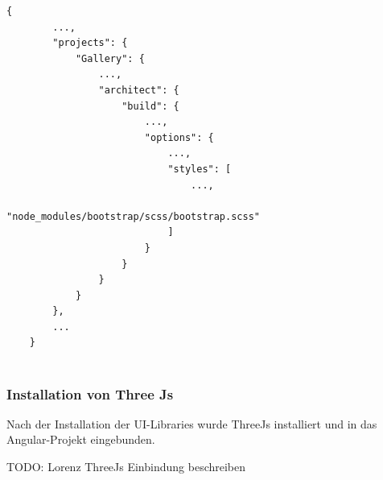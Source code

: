\begin{lstlisting}[caption={{angular.json - Bootstrap Angular Verknüpfung}},label=lst:impl:BootstraptConfig]
    {
        ...,
        "projects": {
            "Gallery": {
                ...,
                "architect": {
                    "build": {
                        ...,
                        "options": {
                            ...,
                            "styles": [
                                ...,
                                "node_modules/bootstrap/scss/bootstrap.scss"
                            ]
                        }
                    }
                }
            }
        },
        ...
    }
    
\end{lstlisting}


\subsubsection{Installation von Three Js}
Nach der Installation der UI-Libraries wurde ThreeJs installiert und in das Angular-Projekt eingebunden. 

TODO: Lorenz ThreeJs Einbindung beschreiben



